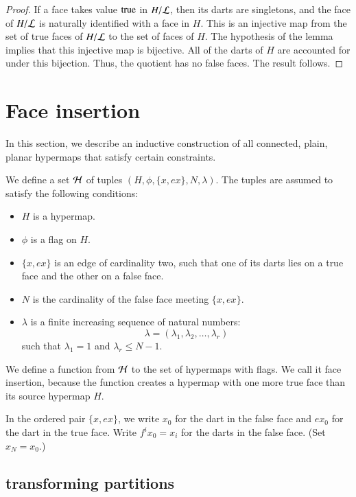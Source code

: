 \begin{proof}  If a face takes value ${\operatorname{true}}$ 
in $H/{\cal L}$, then its darts are
singletons, and the face of $H/{\cal L}$ is naturally identified with
 a face in $H$.  This is an injective map from the 
set of true faces of $H/{\cal L}$ to
the set of faces of $H$.  The hypothesis of the lemma implies that this
injective map is bijective.
All of the darts of $H$ are accounted for under this bijection.
Thus, the quotient has no
false faces.  The result follows.
\end{proof}


\section{Face insertion}


In this section, we describe an inductive construction of all
connected, plain, planar hypermaps that satisfy certain constraints.

We define a set ${\cal H}$ of tuples $(H,\phi,\{x,e x\},N,\lambda)$.
The tuples are assumed to satisfy the following conditions:
\begin{itemize}
    \item $H$ is a hypermap.
    \item $\phi$ is a flag on $H$.
    \item $\{x,e x\}$ is an edge of cardinality two, such that one
    of its darts lies on a true face and the other on a false face.
    \item $N$ is the cardinality of the false face meeting $\{x,e
    x\}$.
    \item $\lambda$ is a finite increasing sequence of natural numbers:
        $$
        \lambda = (\lambda_1,\lambda_2,\ldots,\lambda_r)
        $$
    such that $\lambda_1 = 1$ and $\lambda_r \le N-1$.
\end{itemize}

We define a function from $\cal H$ to the set of hypermaps with
flags.  We call it face insertion, because the function creates a
hypermap with one more true face than its source hypermap $H$.

In the ordered pair $\{x,e x\}$, we write $x_0$ for the dart in the
false face and $e x_0$ for the dart in the true face.  Write $f^i
x_0 = x_i$ for the darts in the false face.  (Set $x_N = x_0$.)

\subsection{transforming partitions}

